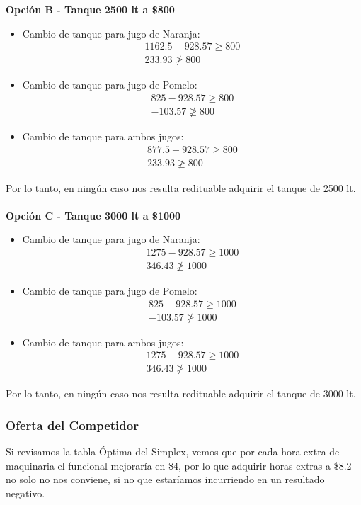 \begin{homeworkProblem}[-1][Citrus]
\textbf{Opción B - Tanque 2500 lt a \$800} \\
\begin{itemize}
  \item Cambio de tanque para jugo de Naranja:
  \begin{align*}
    1162.5 - 928.57 \ge 800 \\
    233.93 \ngeq 800 
  \end{align*}
  \item Cambio de tanque para jugo de Pomelo:
  \begin{align*}
    825 - 928.57 \ge 800 \\
    - 103.57 \ngeq 800 
  \end{align*}
  \item Cambio de tanque para ambos jugos:
  \begin{align*}
    877.5 - 928.57 \ge 800 \\
    233.93 \ngeq 800 
  \end{align*}
\end{itemize}
Por lo tanto, en ningún caso nos resulta redituable adquirir el tanque de 2500 lt.\\ \\ 
\textbf{Opción C - Tanque 3000 lt a \$1000} \\
\begin{itemize}
  \item Cambio de tanque para jugo de Naranja:
  \begin{align*}
    1275 - 928.57 \ge 1000 \\
    346.43 \ngeq 1000 
  \end{align*}
  \item Cambio de tanque para jugo de Pomelo:
  \begin{align*}
    825 - 928.57 \ge 1000 \\
    - 103.57 \ngeq 1000 
  \end{align*}
  \item Cambio de tanque para ambos jugos:
  \begin{align*}
    1275 - 928.57 \ge 1000 \\
    346.43 \ngeq 1000 
  \end{align*}
\end{itemize}
Por lo tanto, en ningún caso nos resulta redituable adquirir el tanque de 3000 lt.
\subsubsection{Oferta del Competidor}
Si revisamos la tabla Óptima del Simplex, vemos que por cada hora extra de maquinaria el funcional mejoraría en \$4, por lo que adquirir horas extras a \$8.2 no solo no nos conviene, si no que estaríamos incurriendo en un resultado negativo.
\end{homeworkProblem}